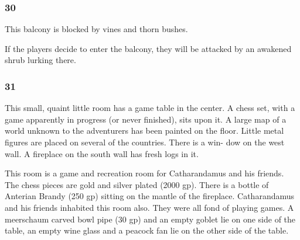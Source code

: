 \documentclass[palace_of_the_silver_princess]{subfiles}
\begin{document}
\subsubsection{30}
\begin{quotebox}
    This balcony is blocked by vines and thorn bushes.
\end{quotebox}

If the players decide to enter the balcony, they will be attacked by an
awakened shrub lurking there.

\subsubsection{31}
\begin{quotebox}
    This small, quaint little room has a game table in the center. A
    chess set, with a game apparently in progress (or never finished),
    sits upon it. A large map of a world unknown to the adventurers has
    been painted on the floor. Little metal figures are placed on
    several of the countries. There is a win- dow on the west wall. A
    fireplace on the south wall has fresh logs in it.
\end{quotebox}

This room is a game and recreation room for Catharandamus and his
friends. The chess pieces are gold and silver plated (2000 gp). There is
a bottle of Anterian Brandy (250 gp) sitting on the mantle of the
fireplace. Catharandamus and his friends inhabited this room also. They
were all fond of playing games. A meerschaum carved bowl pipe (30 gp)
and an empty goblet lie on one side of the table, an empty wine glass
and a peacock fan lie on the other side of the table.
\end{document}
